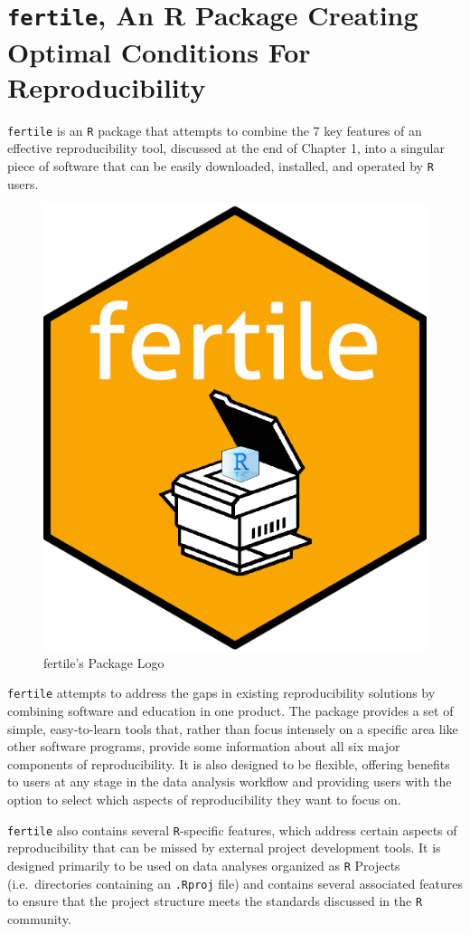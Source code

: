 \documentclass[12pt,twoside]{reedthesis}
\begin{document}
\hypertarget{fertile-an-r-package-creating-optimal-conditions-for-reproducibility}{%
\section{\texorpdfstring{\texttt{fertile}, An R Package Creating Optimal Conditions For Reproducibility}{fertile, An R Package Creating Optimal Conditions For Reproducibility}}\label{fertile-an-r-package-creating-optimal-conditions-for-reproducibility}}

\texttt{fertile} is an \texttt{R} package that attempts to combine the 7 key features of an effective reproducibility tool, discussed at the end of Chapter 1, into a singular piece of software that can be easily downloaded, installed, and operated by \texttt{R} users.
\begin{figure}

{\centering \includegraphics[width=0.3\linewidth]{figure/fertile-hex} 

}

\caption{fertile's Package Logo}\label{fig:unnamed-chunk-8}
\end{figure}
\texttt{fertile} attempts to address the gaps in existing reproducibility solutions by combining software and education in one product. The package provides a set of simple, easy-to-learn tools that, rather than focus intensely on a specific area like other software programs, provide some information about all six major components of reproducibility. It is also designed to be flexible, offering benefits to users at any stage in the data analysis workflow and providing users with the option to select which aspects of reproducibility they want to focus on.

\texttt{fertile} also contains several \texttt{R}-specific features, which address certain aspects of reproducibility that can be missed by external project development tools. It is designed primarily to be used on data analyses organized as \texttt{R} Projects (i.e.~directories containing an \texttt{.Rproj} file) and contains several associated features to ensure that the project structure meets the standards discussed in the \texttt{R} community.
\end{document}
